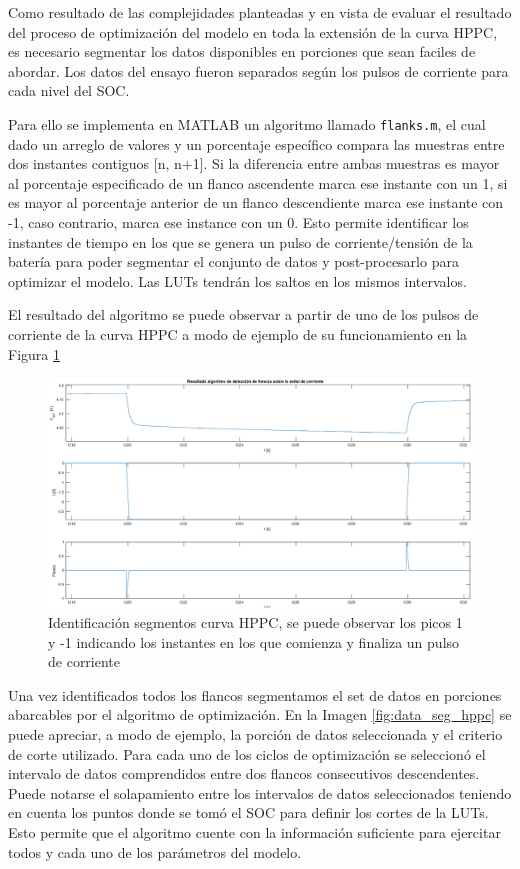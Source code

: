 \documentclass[10pt, a4paper]{report}
\begin{document}
Como resultado de las complejidades planteadas y en vista de evaluar el resultado
del proceso de optimizaci\'on del modelo en toda la extensión de la curva
\acrshort{HPPC}, es necesario segmentar los datos disponibles en porciones que
sean faciles de abordar. Los datos del ensayo fueron separados según
los pulsos de corriente para cada nivel del \acrshort{SOC}. 

Para ello se implementa en MATLAB un algoritmo llamado \texttt{flanks.m}, el cual
dado un arreglo de valores y un porcentaje espec\'ifico compara las muestras
entre dos instantes contiguos [n, n+1]. Si la diferencia entre ambas muestras es
mayor al porcentaje especificado de un flanco ascendente marca ese instante con
un 1, si es mayor al porcentaje anterior de un flanco descendiente marca ese
instante con -1, caso contrario, marca ese instance con un 0. Esto permite
identificar los instantes de tiempo en los que se genera un pulso de
corriente/tensi\'on de la bater\'ia para poder segmentar el conjunto de datos y
post-procesarlo para optimizar el modelo. Las \acrshort{LUT}s tendrán los saltos
en los mismos intervalos.

El resultado del algoritmo se puede observar a partir de uno de los pulsos de
corriente de la curva \acrshort{HPPC} a modo de ejemplo de su funcionamiento en
la Figura \ref{flank_seg_hppc}

\begin{figure}[h!]
    \begin{center}
        \includegraphics[width=.8\textwidth]{flank_seg_hppc.eps}
        \caption{Identificación segmentos curva
        \acrshort{HPPC}, se puede observar los picos 1 y -1 indicando los
        instantes en los que comienza y finaliza un pulso de corriente}
        \label{flank_seg_hppc}
    \end{center}
\end{figure}
\FloatBarrier

Una vez identificados todos los flancos segmentamos el set de datos en porciones
abarcables por el algoritmo de optimización. En la Imagen
\ref{fig:data_seg_hppc} se puede apreciar, a modo de ejemplo, la porción de
datos seleccionada y el criterio de corte utilizado. Para cada uno de los ciclos
de optimización se seleccionó el intervalo de datos comprendidos entre dos
flancos consecutivos descendentes. Puede notarse el solapamiento entre los
intervalos de datos seleccionados teniendo en cuenta los puntos donde se tomó el
\acrshort{SOC} para definir los cortes de la \acrshort{LUT}s. Esto permite que
el algoritmo cuente con la información suficiente para ejercitar todos y cada
uno de los parámetros del modelo.
\end{document}
